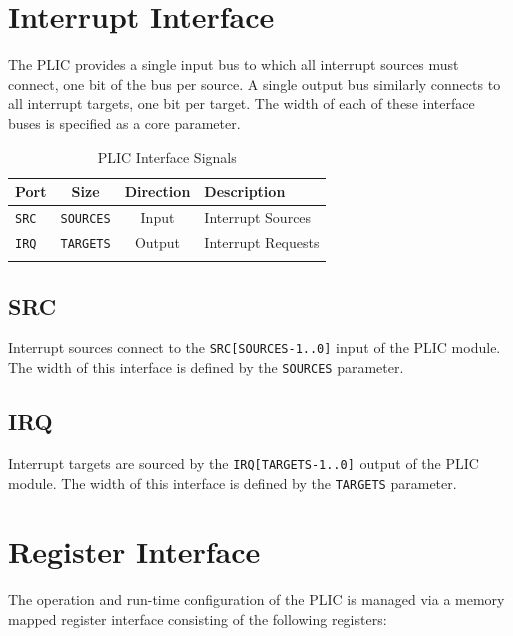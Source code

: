 \section{Interrupt Interface} 

The PLIC provides a single input bus to which all interrupt sources must connect, one bit of the bus per source. A single output bus similarly connects to all interrupt targets, one bit per target. The width of each of these interface buses is specified as a core parameter.

\begin{longtable}[c]{@{\extracolsep{\fill}}lccl@{\extracolsep{\fill}}}	
	\toprule
	\textbf{Port} & \textbf{Size}    & \textbf{Direction} & \textbf{Description}\\
	\midrule 
	\endhead
	\texttt{SRC}  & \texttt{SOURCES} & Input  & Interrupt Sources\\
	\texttt{IRQ}  & \texttt{TARGETS} & Output & Interrupt Requests \\
	\bottomrule 	
	\caption{PLIC Interface Signals} 
	\label{tab:PLICIF2}
\end{longtable}

\subsection{SRC}

Interrupt sources connect to the \texttt{SRC{[}SOURCES-1..0{]}} input of
the PLIC module. The width of this interface is defined by the \texttt{SOURCES} parameter. 

\subsection{IRQ}

Interrupt targets are sourced by the \texttt{IRQ{[}TARGETS-1..0{]}}
output of the PLIC module. The width of this interface is defined by the
\texttt{TARGETS} parameter.

\section{Register Interface}

The operation and run-time configuration of the PLIC is managed via a memory mapped register interface consisting of the following registers:

